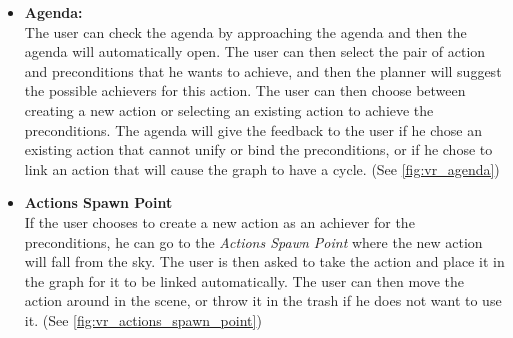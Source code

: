 \begin{itemize}
    \item \textbf{Agenda:} \\
          The user can check the agenda by approaching the agenda and then the agenda will automatically open. The user can then select the pair of action and preconditions that he wants to achieve, and then the planner will suggest the possible achievers for this action. The user can then choose between creating a new action or selecting an existing action to achieve the preconditions. The agenda will give the feedback to the user if he chose an existing action that cannot unify or bind the preconditions, or if he chose to link an action that will cause the graph to have a cycle. (See \autoref{fig:vr_agenda})

    \item \textbf{Actions Spawn Point} \\
          If the user chooses to create a new action as an achiever for the preconditions, he can go to the \textit{Actions Spawn Point} where the new action will fall from the sky. The user is then asked to take the action and place it in the graph for it to be linked automatically. The user can then move the action around in the scene, or throw it in the trash if he does not want to use it. (See \autoref{fig:vr_actions_spawn_point})



\end{itemize}
